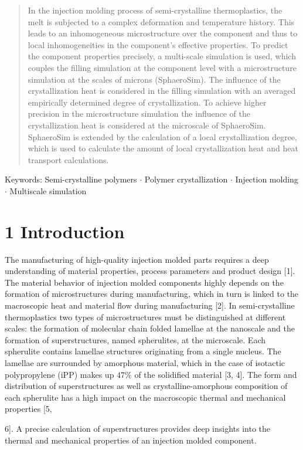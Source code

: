 \documentclass[10pt]{article}
\begin{document}
\begin{abstract}
In the injection molding process of semi-crystalline thermoplastics, the melt is subjected to a complex deformation and temperature history. This leads to an inhomogeneous microstructure over the component and thus to local inhomogeneities in the component's effective properties. To predict the component properties precisely, a multi-scale simulation is used, which couples the filling simulation at the component level with a microstructure simulation at the scales of microns (SphaeroSim). The influence of the crystallization heat is considered in the filling simulation with an averaged empirically determined degree of crystallization. To achieve higher precision in the microstructure simulation the influence of the crystallization heat is considered at the microscale of SphaeroSim. SphaeroSim is extended by the calculation of a local crystallization degree, which is used to calculate the amount of local crystallization heat and heat transport calculations.
\end{abstract}

Keywords: Semi-crystalline polymers $\cdot$ Polymer crystallization $\cdot$ Injection molding $\cdot$ Multiscale simulation

\section*{1 Introduction}
The manufacturing of high-quality injection molded parts requires a deep understanding of material properties, process parameters and product design [1]. The material behavior of injection molded components highly depends on the formation of microstructures during manufacturing, which in turn is linked to the macroscopic heat and material flow during manufacturing [2]. In semi-crystalline thermoplastics two types of microstructures must be distinguished at different scales: the formation of molecular chain folded lamellae at the nanoscale and the formation of superstructures, named spherulites, at the microscale. Each spherulite contains lamellae structures originating from a single nucleus. The lamellae are surrounded by amorphous material, which in the case of isotactic polypropylene (iPP) makes up $47 \%$ of the solidified material [3, 4]. The form and distribution of superstructures as well as crystalline-amorphous composition of each spherulite has a high impact on the macroscopic thermal and mechanical properties [5,

6]. A precise calculation of superstructures provides deep insights into the thermal and mechanical properties of an injection molded component.
\end{document}

